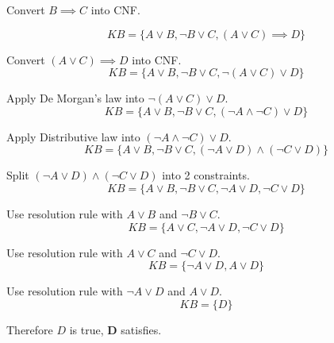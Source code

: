 \documentclass[12pt]{article}
\begin{document}
Convert $B \implies C$ into CNF.

\[
KB = \{A \lor B, \lnot B \lor C, (A \lor C) \implies D \}
\]

Convert $(A \lor C) \implies D$ into CNF.
\[
KB = \{A \lor B, \lnot B \lor C, \lnot (A \lor C) \lor D \}
\]

Apply De Morgan's law into $\lnot (A \lor C) \lor D$.
\[
KB = \{A \lor B, \lnot B \lor C, (\lnot A \land \lnot C) \lor D \}
\]

Apply Distributive law into $(\lnot A \land \lnot C) \lor D$.
\[
KB = \{A \lor B, \lnot B \lor C, (\lnot A \lor D) \land (\lnot C \lor D) \}
\]

Split $(\lnot A \lor D) \land (\lnot C \lor D)$ into 2 constraints.
\[
KB = \{A \lor B, \lnot B \lor C, \lnot A \lor D, \lnot C \lor D \}
\]

Use resolution rule with $A \lor B$ and $\lnot B \lor C$.
\[
KB = \{A \lor C, \lnot A \lor D, \lnot C \lor D \}
\]

Use resolution rule with $A \lor C$ and $\lnot C \lor D$.
\[
KB = \{\lnot A \lor D, A \lor D \}
\]

Use resolution rule with $\lnot A \lor D$ and $A \lor D$.
\[
KB = \{ D \}
\]

Therefore $D$ is true, \textbf{D} satisfies. \\
\null\hfill\square
\end{document}
